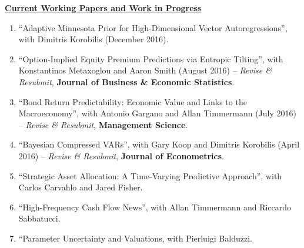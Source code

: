 \documentclass[11pt]{article}
\begin{document}
\underline{\textbf{Current Working Papers and Work in Progress}}
\begin{enumerate}
	\setcounter{enumi}{\theenumTemp}
	\item ``Adaptive Minnesota Prior for High-Dimensional Vector Autoregressions'', with Dimitris Korobilis (December 2016).
	\item ``Option-Implied Equity Premium Predictions via Entropic Tilting'', with Konstantinos Metaxoglou  and Aaron Smith (August 2016) -- \textit{Revise \& Resubmit}, \textbf{Journal of Business \& Economic Statistics}.
	\item ``Bond Return Predictability: Economic Value and Links to the Macroeconomy'', with Antonio Gargano and Allan Timmermann (July 2016) -- \textit{Revise \& Resubmit}, \textbf{Management Science}.
	\item ``Bayesian Compressed VARs'', with Gary Koop and Dimitris Korobilis (April 2016) -- \textit{Revise \& Resubmit}, \textbf{Journal of Econometrics}.
	\item ``Strategic Asset Allocation: A Time-Varying Predictive Approach'', with Carlos Carvahlo and Jared Fisher.
	\item ``High-Frequency Cash Flow News'', with Allan Timmermann and Riccardo Sabbatucci.
	\item ``Parameter Uncertainty and Valuations, with Pierluigi Balduzzi.
	
\end{enumerate}

 
\end{document}
